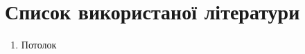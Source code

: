 \chapter{Список використаної літератури}


\begin{enumerate}[label=\arabic*)]
	\item Потолок
\end{enumerate}

